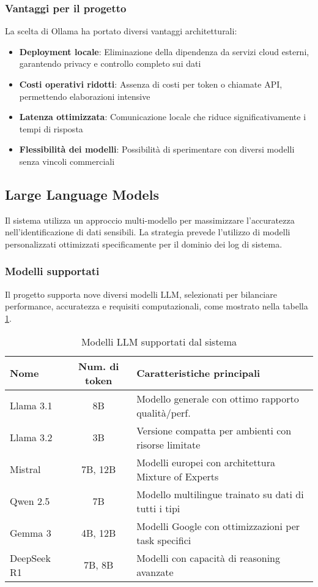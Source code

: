 \documentclass[12pt]{report}
\begin{document}
\subsubsection{Vantaggi per il progetto}
La scelta di Ollama ha portato diversi vantaggi architetturali:

\begin{itemize}
    \item \textbf{Deployment locale}: Eliminazione della dipendenza da servizi cloud esterni, garantendo privacy e controllo completo sui dati
    \item \textbf{Costi operativi ridotti}: Assenza di costi per token o chiamate API, permettendo elaborazioni intensive
    \item \textbf{Latenza ottimizzata}: Comunicazione locale che riduce significativamente i tempi di risposta
    \item \textbf{Flessibilità dei modelli}: Possibilità di sperimentare con diversi modelli senza vincoli commerciali
\end{itemize}

\subsection{Large Language Models}
\label{subsec:llm}

Il sistema utilizza un approccio multi-modello per massimizzare l'accuratezza nell'identificazione di dati sensibili. La strategia prevede l'utilizzo di modelli personalizzati ottimizzati specificamente per il dominio dei log di sistema.

\subsubsection{Modelli supportati}
Il progetto supporta nove diversi modelli LLM, selezionati per bilanciare performance, accuratezza e requisiti computazionali, come mostrato nella tabella \ref{tab:modelli_llm}.

\begin{table}[h!]
    \centering
    \begin{tabular}{|l|c|l|}
        \hline
        \textbf{Nome} & \textbf{Num. di token} & \textbf{Caratteristiche principali} \\ \hline
        Llama 3.1 & 8B & Modello generale con ottimo rapporto qualità/perf. \\ \hline
        Llama 3.2 & 3B & Versione compatta per ambienti con risorse limitate \\ \hline
        Mistral & 7B, 12B & Modelli europei con architettura Mixture of Experts \\ \hline
        Qwen 2.5 & 7B & Modello multilingue trainato su dati di tutti i tipi \\ \hline
        Gemma 3 & 4B, 12B & Modelli Google con ottimizzazioni per task specifici \\ \hline
        DeepSeek R1 & 7B, 8B & Modelli con capacità di reasoning avanzate \\ \hline
    \end{tabular}
    \caption{Modelli LLM supportati dal sistema}
    \label{tab:modelli_llm}
\end{table}
\end{document}
